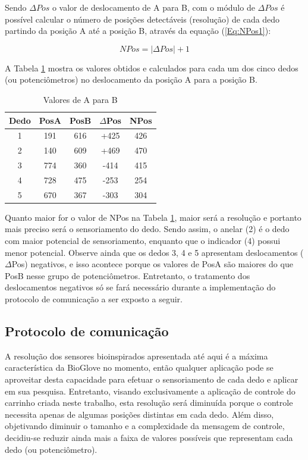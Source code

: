 \documentclass[
	12pt,				%
	openright,			%
	oneside,			%
	a4paper,			%
	english,			%
	brazil				%
	]{abntex2}
\begin{document}
		Sendo $\Delta Pos$ o valor de deslocamento de A para B, com o módulo de $\Delta Pos$ é possível calcular o número de posições detectáveis (resolução) de cada dedo partindo da posição A até a posição B, através da equação (\ref{Eq:NPos1}):

	\begin{equation}
			NPos = |\Delta Pos| + 1
		\label{Eq:NPos1}
	\end{equation}

		A Tabela \ref{Tab:deltapos} mostra os valores obtidos e calculados para cada um dos cinco dedos (ou potenciômetros) no deslocamento da posição A para a posição B.


	\begin{table}[H]
  	\centering
		\caption{Valores de A para B}
    \begin{tabular}{c|cccc}
      \midrule
			Dedo	& PosA	& PosB	& $\Delta$Pos	& NPos	\\
      \midrule
			1 		& 191 	& 616 	& 		+425 		&	426		\\
			2 		& 140 	& 609 	& 		+469 		&	470		\\
			3 		& 774 	& 360 	& 		-414 		&	415		\\
			4 		& 728 	& 475 	& 		-253 		&	254		\\
			5 		& 670 	& 367 	& 		-303 		&	304		\\      
      \midrule
    \end{tabular}
    \label{Tab:deltapos}
	\end{table}
		
		Quanto maior for o valor de NPos na Tabela \ref{Tab:deltapos}, maior será a resolução e portanto mais preciso será o sensoriamento do dedo. Sendo assim, o anelar (2) é o dedo com maior potencial de sensoriamento, enquanto que o indicador (4) possui menor potencial. Observe ainda que os dedos 3, 4 e 5 apresentam deslocamentos ($\Delta$Pos) negativos, e isso acontece porque os valores de PosA são maiores do que PosB nesse grupo de potenciômetros. Entretanto, o tratamento dos deslocamentos negativos só se fará necessário durante a implementação do protocolo de comunicação a ser exposto a seguir.


			\subsection{Protocolo de comunicação}


		A resolução dos sensores bioinspirados apresentada até aqui é a máxima característica da BioGlove no momento, então qualquer aplicação pode se aproveitar desta capacidade para efetuar o sensoriamento de cada dedo e aplicar em sua pesquisa. Entretanto, visando exclusivamente a aplicação de controle do carrinho criada neste trabalho, esta resolução será diminuída porque o controle necessita apenas de algumas posições distintas em cada dedo. Além disso, objetivando diminuir o tamanho e a complexidade da mensagem de controle, decidiu-se reduzir ainda mais a faixa de valores possíveis que representam cada dedo (ou potenciômetro). 
		
\end{document}
